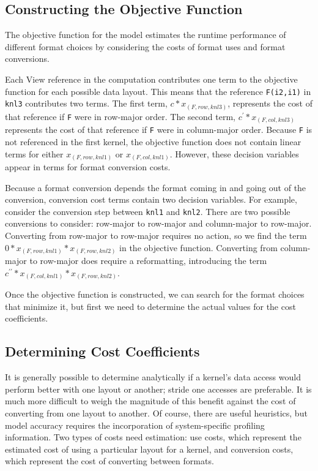 \subsection{Constructing the Objective Function}

The objective function for the model estimates the runtime performance of different format choices by considering the costs of format uses and format conversions.

Each View reference in the computation contributes one term to the objective function for each possible data layout. This means that the reference \verb.F(i2,i1). in \verb.knl3.  contributes two terms.
The first term,  $c * x_{(F,row,knl3)}$,  represents the cost of that reference if \verb.F. were in row-major order. 
The second term, $c^\prime * x_{(F,col,knl3)}$  represents the cost of that reference if \verb.F. were in column-major order.
Because \verb.F. is not referenced in the first kernel, the objective function does not contain linear terms for either $x_{(F,row,knl1)}$ or $x_{(F,col,knl1)}$.
However, these decision variables appear in terms for format conversion costs.

Because a format conversion depends the format coming in and going out of the conversion, conversion cost terms contain two decision variables.
For example, consider the conversion step between \verb.knl1. and \verb.knl2..
There are two possible conversions to consider: row-major to row-major and column-major to row-major. 
Converting from row-major to row-major requires no action, so we  find the term $0 * x_{(F,row,knl1)} * x_{(F,row,knl2)}$ in the objective function.
Converting from column-major to row-major does require a reformatting, introducing the term $c^{\prime\prime} * x_{(F,col,knl1)} * x_{(F,row,knl2)}$.

Once the objective function is constructed, we can search for the format choices that minimize it, but first we need to determine the actual values for the cost coefficients.

\subsection{Determining Cost Coefficients}

It is generally possible to determine analytically if a kernel's data access would perform better with one layout or another; stride one accesses are preferable.
It is much more difficult to weigh the magnitude of this benefit against the cost of converting from one layout to another. 
Of course, there are useful heuristics, but model accuracy requires the incorporation of system-specific profiling information. 
Two types of costs need estimation: use costs, which represent the estimated cost of using a particular layout for a kernel, and conversion costs, which represent the cost of converting between formats.

